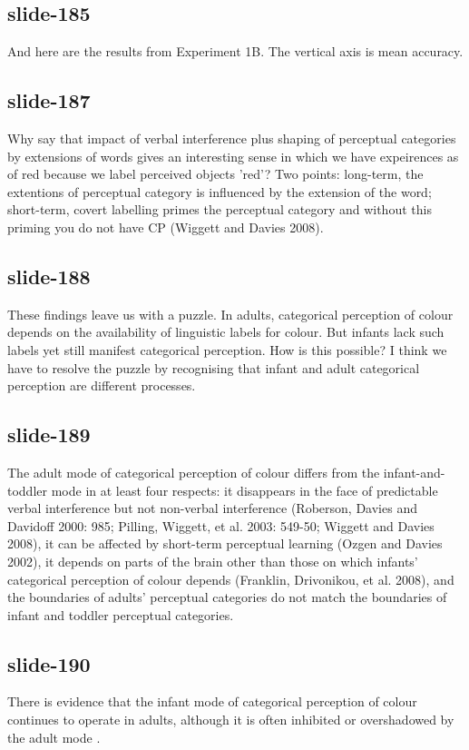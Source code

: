 \documentclass[12pt,\papersize]{extarticle}
\begin{document}
 
\subsection{slide-185}
And here are the results from Experiment 1B. The vertical axis is mean accuracy.
 
 
\subsection{slide-187}
Why say that impact of verbal interference plus shaping of perceptual categories by extensions of words gives an interesting sense in which we have expeirences as of red because we label perceived objects 'red'? Two points: long-term, the extentions of perceptual category is influenced by the extension of the word; short-term, covert labelling primes the perceptual category and without this priming you do not have CP (Wiggett and Davies 2008).
 
 
\subsection{slide-188}
These findings leave us with a puzzle.
In adults, categorical perception of colour depends on the availability of linguistic labels for colour.
But infants lack such labels yet still manifest categorical perception.
How is this possible?
I think we have to resolve the puzzle by recognising that infant and adult categorical perception are different processes.
 
 
\subsection{slide-189}
The adult mode of categorical perception of colour differs from the infant-and-toddler mode in at least four respects: it disappears in the face of predictable verbal interference but not non-verbal interference (Roberson, Davies and Davidoff 2000: 985; Pilling, Wiggett, et al. 2003: 549-50; Wiggett and Davies 2008), it can be affected by short-term perceptual learning (Ozgen and Davies 2002), it depends on parts of the brain other than those on which infants' categorical perception of colour depends (Franklin, Drivonikou, et al. 2008), and the boundaries of adults' perceptual categories do not match the boundaries of infant and toddler perceptual categories.
 
 
\subsection{slide-190}
There is evidence that the infant mode of categorical perception of colour continues to operate in adults, although it is often inhibited or overshadowed by the adult mode \citep{Gilbert:2006yb}.
 
 
 

 






\end{document}
